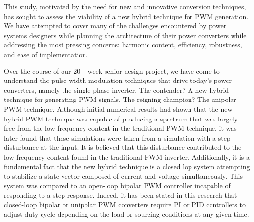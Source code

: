 This study, motivated by the need for new and innovative conversion techniques, has sought to assess the viability of a new hybrid technique for PWM generation. We have attempted to cover many of the challenges encountered by power systems designers while planning the architecture of their power converters while addressing the most pressing concerns: harmonic content, efficiency, robustness, and ease of implementation.

Over the course of our 20+ week senior design project, we have come to understand the pulse-width modulation techniques that drive today's power converters, namely the single-phase inverter. The contender? A new hybrid technique for generating PWM signals. The reigning champion? The unipolar PWM technique. Although initial numerical results had shown that the new hybrid PWM technique was capable of producing a spectrum that was largely free from the low frequency content in the traditional PWM technique, it was later found that these simulations were taken from a simulation with a step disturbance at the input. It is believed that this disturbance contributed to the low frequency content found in the traditional PWM inverter. Additionally, it is a fundamental fact that the new hybrid technique is a closed lop system attempting to stabilize a state vector composed of current and voltage simultaneously. This system was compared to an open-loop bipolar PWM controller incapable of responding to a step response. Indeed, it has been stated in this research that closed-loop bipolar or unipolar PWM converters require PI or PID controllers to adjust duty cycle depending on the load or sourcing conditions at any given time. 
 


